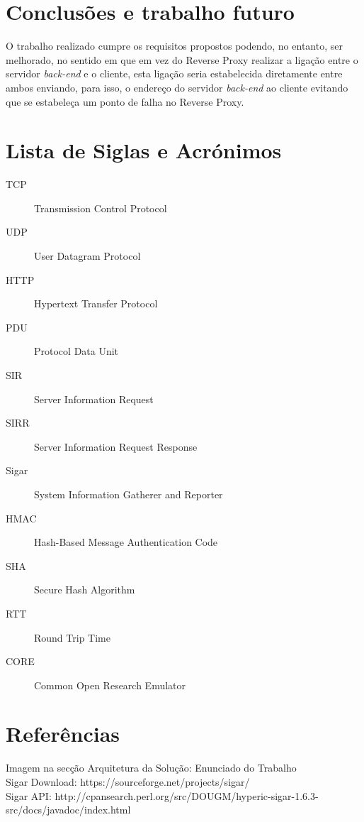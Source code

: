 \documentclass{article}
\begin{document}
\section{Conclusões e trabalho futuro}
O trabalho realizado cumpre os requisitos propostos podendo, no entanto, ser melhorado, no sentido em que em vez do Reverse Proxy realizar a ligação entre o servidor \textit{back-end} e o cliente, esta ligação seria estabelecida diretamente entre ambos enviando, para isso, o endereço do servidor \textit{back-end} ao cliente evitando que se estabeleça um ponto de falha no Reverse Proxy.

\section{Lista de Siglas e Acrónimos}
\begin{description}
    \item [TCP] Transmission Control Protocol
    \item [UDP] User Datagram Protocol
    \item [HTTP] Hypertext Transfer Protocol
    \item [PDU] Protocol Data Unit
    \item [SIR] Server Information Request
    \item [SIRR] Server Information Request Response
    \item [Sigar] System Information Gatherer and Reporter
    \item [HMAC] Hash-Based Message Authentication Code
    \item [SHA] Secure Hash Algorithm
    \item [RTT] Round Trip Time
    \item [CORE] Common Open Research Emulator
\end{description}

\section{Referências}
Imagem na secção Arquitetura da Solução: Enunciado do Trabalho\\
Sigar Download: https://sourceforge.net/projects/sigar/\\
Sigar API: http://cpansearch.perl.org/src/DOUGM/hyperic-sigar-1.6.3-src/docs/javadoc/index.html\\
\end{document}
